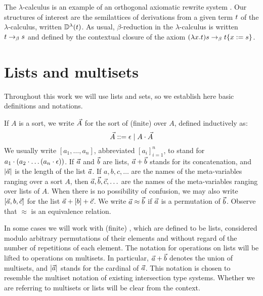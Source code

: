 The $\lambda$-calculus is an example of an orthogonal axiomatic rewrite system \cite{thesismellies}.
Our structures of interest are the semilattices of derivations from a given
term $t$ of the $\lambda$-calculus,
written $\mathbb{D}^{\lambda}(t)$.
As usual, $\beta$-reduction in the $\lambda$-calculus
is written $t \mathrel{\to_\beta} s$
and defined by the contextual closure of the axiom $(\lambda x. t)s \mathrel{\to_\beta} t\{x := s\}$.


\section{Lists and multisets}

Throughout this work we will use lists and sets, so we establish here basic definitions and notations.

\begin{definition}
If $A$ is a sort, we write $\vec{A}$ for the sort of (finite)  over $A$,
defined inductively as:
\[
  \vec{A} ::= \epsilon \mid A \cdot \vec{A}
  \]
We usually write $[a_1, \hdots, a_n]$,
abbreviated $[a_i]_{i=1}^{n}$,
to stand for $a_1 \cdot (a_2 \cdot \hdots (a_n \cdot \epsilon))$.
If $\vec{a}$ and $\vec{b}$ are lists, $\vec{a} + \vec{b}$ stands for its concatenation,
and $|\vec{a}|$ is the length of the list $\vec{a}$.
If $a,b,c,\hdots$ are the names of the meta-variables ranging over a sort $A$,
then $\vec{a},\vec{b},\vec{c},\hdots$
are the names of the meta-variables ranging over lists of $A$.
When there is no possibility of confusion, we may also write $[\vec{a},b,\vec{c}]$
for the list $\vec{a} + [b] + \vec{c}$.
We write $\vec{a} \approx \vec{b}$ if $\vec{a}$ is a permutation of $\vec{b}$.
Observe that $\approx$ is an equivalence relation.

In some cases we will work with (finite) ,
which are defined to be lists,
considered modulo arbitrary permutations of their elements
and without regard of the number of repetitions of each element.
The notation for operations on lists will be lifted to operations
on multisets.
In particular, $\vec{a} + \vec{b}$ denotes the union of multisets,
and $|\vec{a}|$ stands for the cardinal of $\vec{a}$.
This notation is chosen to resemble the multiset notation of existing
intersection type systems. Whether we are referring to multisets or lists will be
clear from the context.
\end{definition}






